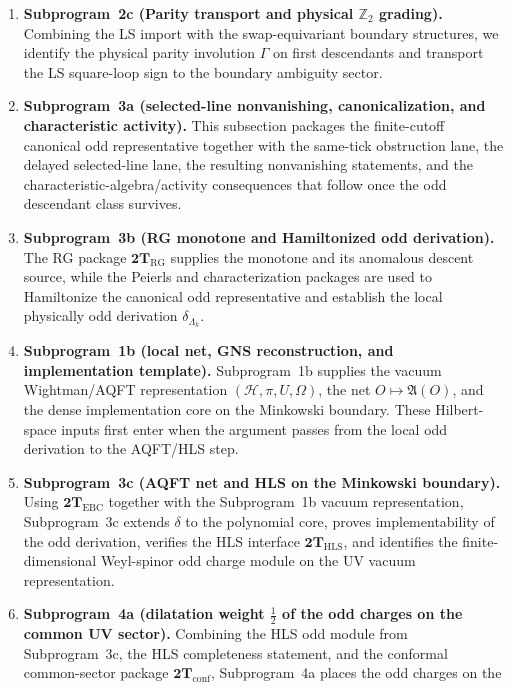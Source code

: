 \begin{enumerate}[label=\textnormal{(\roman*)},leftmargin=*,itemsep=0.4em]
  swap-equivariant Green operators, and the resulting Poisson automorphism
  property of the boundary swap involution.
\item \textbf{Subprogram~2c (Parity transport and physical \(\mathbb Z_2\) grading).}  Combining
  the LS import with the swap-equivariant boundary structures, we identify the
  physical parity involution \(\Gamma\) on first descendants and transport the
  LS square-loop sign to the boundary ambiguity sector.
\item \textbf{Subprogram~3a (selected-line nonvanishing, canonicalization, and characteristic activity).}
  This subsection packages the finite-cutoff canonical odd representative
  together with the same-tick obstruction lane, the delayed selected-line lane,
  the resulting nonvanishing statements, and the characteristic-algebra/activity
  consequences that follow once the odd descendant class survives.
\item \textbf{Subprogram~3b (RG monotone and Hamiltonized odd derivation).}
  The RG package \(\mathbf{2T}_{\mathrm{RG}}\) supplies the monotone and its
  anomalous descent source, while the Peierls and characterization packages are
  used to Hamiltonize the canonical odd representative and establish the local
  physically odd derivation \(\delta_{\Lambda_k}\).
\item \textbf{Subprogram~1b (local net, GNS reconstruction, and implementation template).}
  Subprogram~1b supplies the vacuum Wightman/AQFT representation
  \((\mathcal H,\pi,U,\Omega)\), the net \(O\mapsto\mathfrak A(O)\), and the
  dense implementation core on the Minkowski boundary.  These Hilbert-space
  inputs first enter when the argument passes from the local odd derivation to
  the AQFT/HLS step.
\item \textbf{Subprogram~3c (AQFT net and HLS on the Minkowski boundary).}
  Using \(\mathbf{2T}_{\mathrm{EBC}}\) together with the Subprogram~1b vacuum
  representation, Subprogram~3c extends \(\delta\) to the polynomial core,
  proves implementability of the odd derivation, verifies the HLS interface
  \(\mathbf{2T}_{\mathrm{HLS}}\), and identifies the finite-dimensional
  Weyl-spinor odd charge module on the UV vacuum representation.
\item \textbf{Subprogram~4a (dilatation weight \(\tfrac12\) of the odd charges on the common UV sector).}
  Combining the HLS odd module from Subprogram~3c, the HLS completeness
  statement, and the conformal common-sector package
  \(\mathbf{2T}_{\mathrm{conf}}\), Subprogram~4a places the odd charges on the

\end{enumerate}
